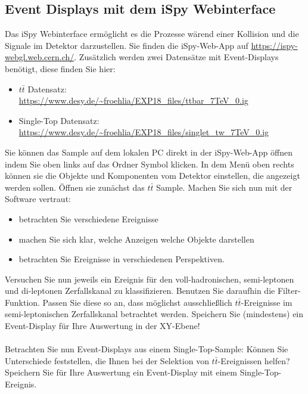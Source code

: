 \subsection{Event Displays mit dem iSpy Webinterface}
Das iSpy Webinterface ermöglicht es die Prozesse w\"arend einer Kollision und die Signale im Detektor darzustellen. Sie finden die iSpy-Web-App auf \url{https://ispy-webgl.web.cern.ch/}. Zusätzlich werden zwei Datensätze mit Event-Displays benötigt, diese finden Sie hier:
\begin{itemize}
	\item  $t\bar{t}$ Datensatz:\\ \url{https://www.desy.de/~froehlia/EXP18_files/ttbar_7TeV_0.ig}
	\item  Single-Top Datensatz:\\ \url{https://www.desy.de/~froehlia/EXP18_files/singlet_tw_7TeV_0.ig}
\end{itemize}
Sie k\"onnen das Sample auf dem lokalen PC direkt in der iSpy-Web-App öffnen indem Sie oben links auf das Ordner Symbol klicken.
In dem Menü oben rechts können sie die Objekte und Komponenten vom Detektor einstellen, die angezeigt werden sollen. 
\"Offnen sie zunächst das $t\bar{t}$ Sample.
Machen Sie sich nun mit der Software vertraut:
\begin{itemize}
\item betrachten Sie verschiedene Ereignisse
\item machen Sie sich klar, welche Anzeigen welche Objekte darstellen
\item betrachten Sie Ereignisse in verschiedenen Perspektiven.
\end{itemize}
Versuchen Sie nun jeweils ein Ereignis f\"ur den voll-hadronischen, semi-leptonen und di-leptonen Zerfallskanal zu klassifizieren. Benutzen Sie daraufhin die Filter-Funktion. Passen Sie diese so an, dass m\"oglichst ausschlie{\ss}lich $t\bar{t}$-Ereignisse im semi-leptonischen Zerfallskanal betrachtet werden. Speichern Sie (mindestens) ein Event-Display f\"ur Ihre Auswertung in der XY-Ebene!\\
\\
Betrachten Sie nun Event-Displays aus einem Single-Top-Sample:
K\"onnen Sie Unterschiede feststellen, die Ihnen bei der Selektion von $t\bar{t}$-Ereignissen helfen? 
Speichern Sie f\"ur Ihre Auswertung ein Event-Display mit einem Single-Top-Ereignis.


